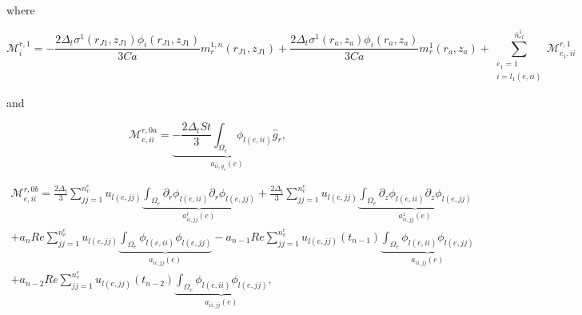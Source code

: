 \documentclass{article}
\begin{document}
where

\begin{equation}
\mathcal{M}_i^{r,1} = -\frac{2\Delta_t \sigma^1(r_{J1},z_{J1})\phi_i(r_{J1},z_{J1})}{3Ca} m_r^{1,n}(r_{J1},z_{J1}) + \frac{2\Delta_t \sigma^1(r_a,z_a)\phi_i(r_a,z_a)}{3Ca} m_r^{1}(r_a,z_a) + \sum_{\substack{e_1=1 \\ i=l_1(e,ii)}}^{\bar{n}_{el}^1} \mathcal{M}_{e_1,ii}^{r,1} \tag{4.131}
\end{equation}

and

\begin{equation}
\mathcal{M}_{e,ii}^{r,0a} = \underbrace{ -\frac{2\Delta_t St}{3} \int_{\Omega_e} \phi_{l(e,ii)} \hat{g}_r }_{a_{ii,g_r}(e)}, \tag{4.132}
\end{equation}

\begin{equation}
\begin{array}{l} \mathcal{M}_{e,ii}^{r,0b} = \frac{2\Delta_t}{3} \sum_{jj=1}^{n_v^e} u_{l(e,jj)} \underbrace{ \int_{\Omega_e} \partial_r \phi_{l(e,ii)} \partial_r \phi_{l(e,jj)} }_{a_{ii,jj}^r(e)} + \frac{2\Delta_t}{3} \sum_{jj=1}^{n_v^e} u_{l(e,jj)} \underbrace{ \int_{\Omega_e} \partial_z \phi_{l(e,ii)} \partial_z \phi_{l(e,jj)} }_{a_{ii,jj}^z(e)} \\ + a_n Re \sum_{jj=1}^{n_v^e} u_{l(e,jj)} \underbrace{ \int_{\Omega_e} \phi_{l(e,ii)} \phi_{l(e,jj)} }_{a_{ii,jj}(e)} - a_{n-1} Re \sum_{jj=1}^{n_v^e} u_{l(e,jj)}(t_{n-1}) \underbrace{ \int_{\Omega_e} \phi_{l(e,ii)} \phi_{l(e,jj)} }_{a_{ii,jj}(e)} \\ + a_{n-2} Re \sum_{jj=1}^{n_v^e} u_{l(e,jj)}(t_{n-2}) \underbrace{ \int_{\Omega_e} \phi_{l(e,ii)} \phi_{l(e,jj)} }_{a_{ii,jj}(e)}, \end{array} \tag{4.133}
\end{equation}
\end{document}
